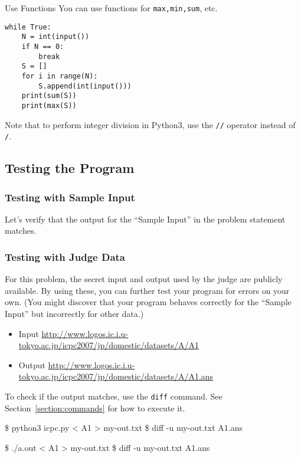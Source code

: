 \begin{tipsbox}{Use Functions}
  You can use functions for \texttt{max,min,sum}, etc.
\end{tipsbox}

\begin{pybox}
\begin{verbatim}
while True:
    N = int(input())
    if N == 0:
        break
    S = []
    for i in range(N):
        S.append(int(input()))
    print(sum(S))
    print(max(S))
\end{verbatim}
\end{pybox}
Note that to perform integer division in Python3, use the \texttt{//} operator instead of \texttt{/}.
\subsection{Testing the Program}

\subsubsection{Testing with Sample Input}

Let's verify that the output for the ``Sample Input'' in the problem statement matches.

\subsubsection{Testing with Judge Data}
For this problem, the secret input and output used by the judge are publicly available. By using these, you can further test your program for errors on your own. (You might discover that your program behaves correctly for the ``Sample Input'' but incorrectly for other data.)
\begin{itemize}
\item Input \url{http://www.logos.ic.i.u-tokyo.ac.jp/icpc2007/jp/domestic/datasets/A/A1}
\item Output \url{http://www.logos.ic.i.u-tokyo.ac.jp/icpc2007/jp/domestic/datasets/A/A1.ans}
\end{itemize}

To check if the output matches, use the \texttt{diff} command. See Section~\ref{section:commands} for how to execute it.

\begin{terminal}
\$ python3 icpc.py < A1 > my-out.txt
\$ diff -u my-out.txt A1.ans  
\end{terminal}

\begin{terminal}
\$ ./a.out < A1 > my-out.txt
\$ diff -u my-out.txt A1.ans  
\end{terminal}

